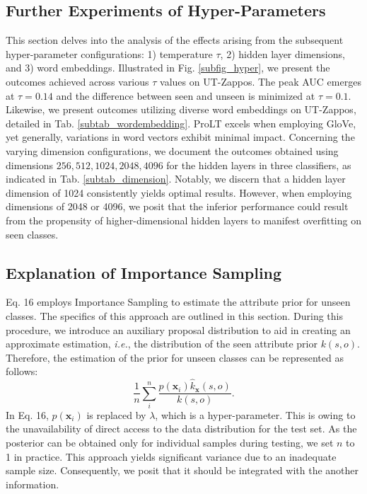 \documentclass[letterpaper]{article} %
\newcommand{\mx}{\mathbf{x}}
\newcommand{\ie}{\textit{i.e.}}
\theoremstyle{definition}
\begin{document}
\subsection{Further Experiments of Hyper-Parameters}
This section delves into the analysis of the effects arising from the subsequent hyper-parameter configurations: 1) temperature $\tau$, 2) hidden layer dimensions, and 3) word embeddings. Illustrated in Fig. \ref{subfig_hyper}, we present the outcomes achieved across various $\tau$ values on UT-Zappos. The peak AUC emerges at $\tau=0.14$ and the difference between seen and unseen is minimized at $\tau=0.1$. Likewise, we present outcomes utilizing diverse word embeddings on UT-Zappos, detailed in Tab. \ref{subtab_wordembedding}. ProLT excels when employing GloVe, yet generally, variations in word vectors exhibit minimal impact. Concerning the varying dimension configurations, we document the outcomes obtained using dimensions ${256,512,1024,2048,4096}$ for the hidden layers in three classifiers, as indicated in Tab. \ref{subtab_dimension}. Notably, we discern that a hidden layer dimension of 1024 consistently yields optimal results. However, when employing dimensions of 2048 or 4096, we posit that the inferior performance could result from the propensity of higher-dimensional hidden layers to manifest overfitting on seen classes.

\subsection{Explanation of Importance Sampling}
Eq. 16 employs Importance Sampling to estimate the attribute prior for unseen classes. The specifics of this approach are outlined in this section. During this procedure, we introduce an auxiliary proposal distribution to aid in creating an approximate estimation, \ie, the distribution of the seen attribute prior $k(s,o)$. Therefore, the estimation of the prior for unseen classes can be represented as follows:
	\begin{equation}
\frac{1}{n}\sum_{i}^{n}\frac{p(\mx_i)\hat{k}_{\mx}(s,o)}{k(s,o)}.
        \label{subeq_is}
	\end{equation}
In Eq. 16, $p(\mx_i)$ is replaced by $\lambda$, which is a hyper-parameter. This is owing to the unavailability of direct access to the data distribution for the test set. As the posterior can be obtained only for individual samples during testing, we set $n$ to 1 in practice. This approach yields significant variance due to an inadequate sample size. Consequently, we posit that it should be integrated with the another information.
\end{document}
